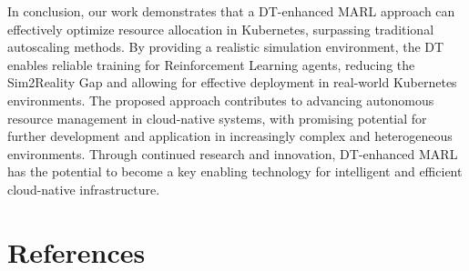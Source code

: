 \documentclass[conference]{IEEEtran}
\begin{document}
In conclusion, our work demonstrates that a DT-enhanced MARL approach can effectively optimize resource allocation in Kubernetes, surpassing traditional autoscaling methods. By providing a realistic simulation environment, the DT enables reliable training for Reinforcement Learning agents, reducing the Sim2Reality Gap and allowing for effective deployment in real-world Kubernetes environments. The proposed approach contributes to advancing autonomous resource management in cloud-native systems, with promising potential for further development and application in increasingly complex and heterogeneous environments. Through continued research and innovation, DT-enhanced MARL has the potential to become a key enabling technology for intelligent and efficient cloud-native infrastructure.



\section*{References}

% 



\end{document}
